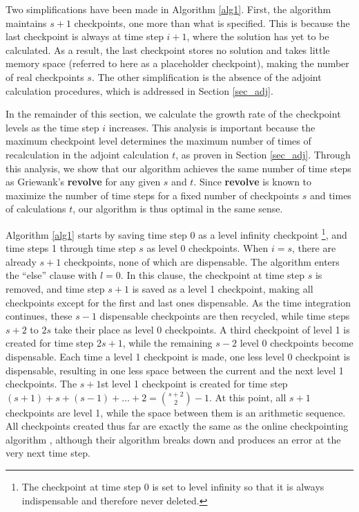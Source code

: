 \documentclass[oneeqnum, onethmnum, onefignum, onetabnum]{siamltex}
\begin{document}
Two simplifications have been made in Algorithm \ref{alg1}.
First, the algorithm maintains $s + 1$ checkpoints, one more than
what is specified.  This is because the last checkpoint is always at time step
$i + 1$, where the solution has yet to be calculated.  As a result, the last
checkpoint stores no solution and takes little memory space (referred to here
as a placeholder checkpoint), making the number of real checkpoints
$s$.  The other simplification is the absence of the adjoint calculation
procedures, which is addressed in Section \ref{sec_adj}.

In the remainder of this section, we calculate the growth rate of the
checkpoint levels as the time step $i$ increases.  This analysis is important
because the maximum checkpoint level determines the maximum number of times of
recalculation in the adjoint calculation $t$, as proven in Section
\ref{sec_adj}.  Through this analysis, we show that our algorithm achieves
the same number of time steps as Griewank's {\bf revolve} for any given $s$
and $t$.  Since {\bf revolve} is known to maximize the number of time steps
for a fixed number of checkpoints $s$ and times of calculations $t$,
our algorithm is thus optimal in the same sense.

Algorithm \ref{alg1} starts by saving time step 0 as a level infinity
checkpoint \footnote{The checkpoint at time step 0 is set to level
infinity so that it is always indispensable and therefore never deleted.},
and time steps 1 through time step $s$ as
level 0 checkpoints.  When $i = s$, there are already $s + 1$
checkpoints, none of which are dispensable.  The algorithm enters the
``else'' clause with $l = 0$.  In this clause, the checkpoint at time step
$s$ is removed, and time step $s + 1$ is saved as a level 1
checkpoint, making all checkpoints except for the first and last ones
dispensable.  As the time integration continues, these $s - 1$ dispensable
checkpoints are then recycled, while time steps $s + 2$ to $2 s$ take
their place as level 0 checkpoints.  A third checkpoint of level 1 is created
for time step $2 s + 1$, while the remaining $s - 2$ level 0
checkpoints become dispensable.  Each time a level 1 checkpoint is made, one
less level 0 checkpoint is dispensable, resulting in one less space between
the current and the next level 1 checkpoints.  The $s + 1$st level 1
checkpoint is created for time step
$(s + 1) + s + (s - 1) + \ldots + 2 = \binom{s + 2}{2} - 1$.
At this point, all $s + 1$ checkpoints are level 1, while the space
between them is an arithmetic sequence.  All checkpoints created thus far are
exactly the same as the online checkpointing algorithm \cite{heuveline2006},
although their algorithm breaks down and produces an
error at the very next time step.
\end{document}
